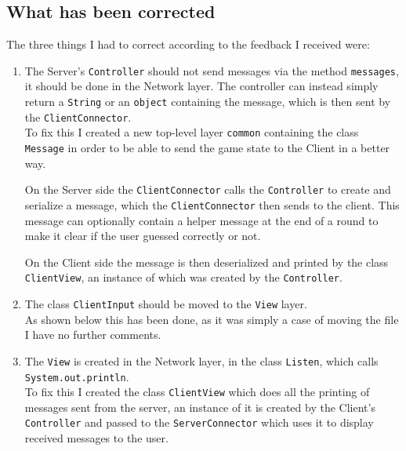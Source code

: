 \documentclass[a4paper]{scrartcl}
\begin{document}
\subsection{What has been corrected}

The three things I had to correct according to the feedback I received were:
\begin{enumerate}
	\item{
		The Server's \texttt{Controller} should not send messages via the method \texttt{messages}, it should be done in the Network layer. The controller can instead simply return a \texttt{String} or an \texttt{object} containing the message, which is then sent by the \texttt{ClientConnector}.\\
		To fix this I created a new top-level layer \texttt{common} containing the class \texttt{Message} in order to be able to send the game state to the Client in a better way.
		
		On the Server side the \texttt{ClientConnector} calls the \texttt{Controller} to create and serialize a message, which the \texttt{ClientConnector} then sends to the client. This message can optionally contain a helper message at the end of a round to make it clear if the user guessed correctly or not.
		
		
		On the Client side the message is then deserialized and printed by the class \texttt{ClientView}, an instance of which was created by the \texttt{Controller}.
		
		
	}
	\item{
		The class \texttt{ClientInput} should be moved to the \texttt{View} layer.\\
		As shown below this has been done, as it was simply a case of moving the file I have no further comments.
		
	}
	\item{
		The \texttt{View} is created in the Network layer, in the class \texttt{Listen}, which calls \texttt{System.out.println}.\\
		To fix this I created the class \texttt{ClientView} which does all the printing of messages sent from the server, an instance of it is created by the Client's \texttt{Controller} and passed to the \texttt{ServerConnector} which uses it to display received messages to the user.
				
		
	}
\end{enumerate}
\end{document}
